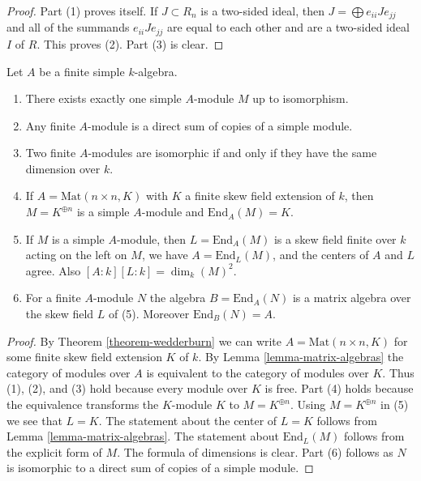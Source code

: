 \begin{proof}
Part (1) proves itself. If $J \subset R_n$ is a two-sided ideal, then
$J = \bigoplus e_{ii}Je_{jj}$ and all of the summands $e_{ii}Je_{jj}$ are
equal to each other and are a two-sided ideal $I$ of $R$. This proves (2).
Part (3) is clear.
\end{proof}

\begin{lemma}
\label{lemma-simple-module-unique}
Let $A$ be a finite simple $k$-algebra.
\begin{enumerate}
\item There exists exactly one simple $A$-module $M$ up to isomorphism.
\item Any finite $A$-module is a direct sum of copies of a simple module.
\item Two finite $A$-modules are isomorphic if and only if they
have the same dimension over $k$.
\item If $A = \text{Mat}(n \times n, K)$ with $K$ a finite skew field
extension of $k$, then $M = K^{\oplus n}$ is a simple $A$-module and
$\text{End}_A(M) = K$.
\item If $M$ is a simple $A$-module, then $L = \text{End}_A(M)$
is a skew field finite over $k$ acting on the left on $M$, we have
$A = \text{End}_L(M)$, and the centers of $A$ and $L$ agree.
Also $[A : k] [L : k] = \dim_k(M)^2$.
\item For a finite $A$-module $N$ the algebra $B = \text{End}_A(N)$ is a
matrix algebra over the skew field $L$ of (5). Moreover $\text{End}_B(N) = A$.
\end{enumerate}
\end{lemma}

\begin{proof}
By
Theorem \ref{theorem-wedderburn}
we can write $A = \text{Mat}(n \times n, K)$ for some finite skew
field extension $K$ of $k$. By
Lemma \ref{lemma-matrix-algebras}
the category of modules over $A$ is equivalent to the category of
modules over $K$. Thus (1), (2), and (3) hold
because every module over $K$ is free. Part (4) holds
because the equivalence transforms the $K$-module $K$
to $M = K^{\oplus n}$. Using $M = K^{\oplus n}$ in (5)
we see that $L = K$. The statement about the center of $L = K$
follows from
Lemma \ref{lemma-matrix-algebras}.
The statement about $\text{End}_L(M)$ follows from the explicit form
of $M$. The formula of dimensions is clear.
Part (6) follows as $N$ is isomorphic to a direct sum of
copies of a simple module.
\end{proof}

